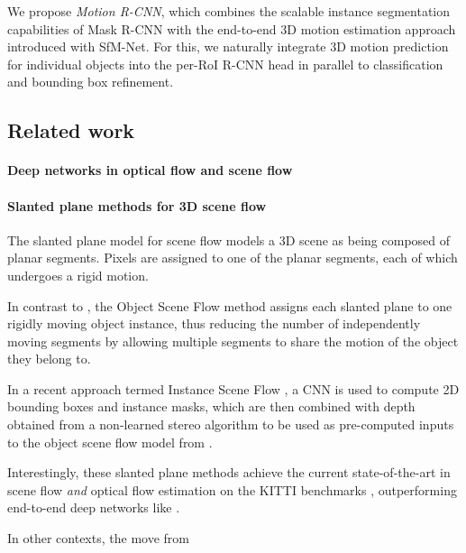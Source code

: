 We propose \emph{Motion R-CNN}, which combines the scalable instance segmentation capabilities of
Mask R-CNN with the end-to-end 3D motion estimation approach introduced with SfM-Net.
For this, we naturally integrate 3D motion prediction for individual objects into the per-RoI R-CNN head
in parallel to classification and bounding box refinement.

\subsection{Related work}

\paragraph{Deep networks in optical flow and scene flow}

\cite{FlowLayers}
\cite{ESI}

\paragraph{Slanted plane methods for 3D scene flow}
The slanted plane model for scene flow \cite{PRSF, PRSM} models a 3D scene as being
composed of planar segments. Pixels are assigned to one of the planar segments,
each of which undergoes a rigid motion.

In contrast to \cite{PRSF, PRSM}, the Object Scene Flow method \cite{KITTI2015}
assigns each slanted plane to one rigidly moving object instance, thus
reducing the number of independently moving segments by allowing multiple
segments to share the motion of the object they belong to.

In a recent approach termed Instance Scene Flow \cite{InstanceSceneFlow},
a CNN is used to compute 2D bounding boxes and instance masks, which are then combined
with depth obtained from a non-learned stereo algorithm to be used as pre-computed
inputs to the object scene flow model from \cite{KITTI2015}.

Interestingly, these slanted plane methods achieve the current state-of-the-art
in scene flow \emph{and} optical flow estimation on the KITTI benchmarks \cite{KITTI2012, KITTI2015},
outperforming end-to-end deep networks like \cite{FlowNet2, SceneFlowDataset}.

%
In other contexts, the move from

